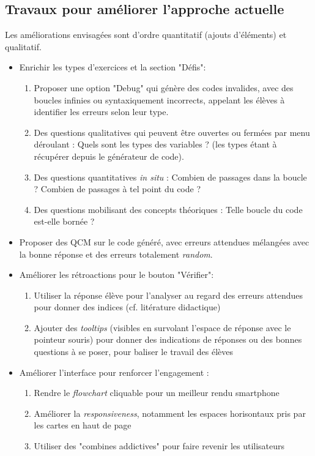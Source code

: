 \documentclass[11pt,a4paper]{article}
\begin{document}
\subsection{Travaux pour améliorer l'approche actuelle}
Les améliorations envisagées sont d'ordre quantitatif (ajouts d'éléments) et qualitatif.

\begin{itemize}
    \item Enrichir les types d'exercices et la section "Défis": 
    \begin{enumerate}
        \item Proposer une option "Debug" qui génère des codes invalides, avec des boucles infinies ou syntaxiquement incorrects, appelant les élèves à identifier les erreurs selon leur type.
        \item Des questions qualitatives qui peuvent être ouvertes ou fermées par menu déroulant : Quels sont les types des variables ? (les types étant à récupérer depuis le générateur de code).
        \item Des questions quantitatives \textit{in situ} : Combien de passages dans la boucle ? Combien de passages à tel point du code ?
        \item Des questions mobilisant des concepts théoriques : Telle boucle du code est-elle bornée ? 
    \end{enumerate}

    \item Proposer des QCM sur le code généré, avec erreurs attendues mélangées avec la bonne réponse et des erreurs totalement \textit{random}.
    
    \item Améliorer les rétroactions pour le bouton "Vérifier":
    \begin{enumerate}
        \item Utiliser la réponse élève pour l'analyser au regard des erreurs attendues pour donner des indices (cf. litérature didactique)
        \item Ajouter des \textit{tooltips} (visibles en survolant l'espace de réponse avec le pointeur souris) pour donner des indications de réponses ou des bonnes questions à se poser, pour baliser le travail des élèves
    \end{enumerate}
    
    \item Améliorer l'interface pour renforcer l'engagement :
    \begin{enumerate}
        \item Rendre le \textit{flowchart} cliquable pour un meilleur rendu smartphone
        \item Améliorer la \textit{responsiveness}, notamment les espaces horisontaux pris par les cartes en haut de page
        \item Utiliser des "combines addictives" pour faire revenir les utilisateurs
    \end{enumerate}



\end{itemize}
\end{document}
